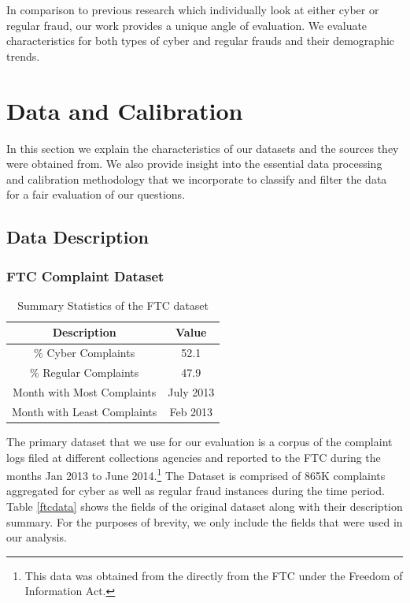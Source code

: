 \documentclass[conference]{IEEEtran}
\begin{document}
In comparison to previous research which individually look at either cyber or regular fraud, our work provides a unique angle of evaluation. We evaluate characteristics for both types of cyber and regular frauds and their demographic trends.

\section{Data and Calibration} \label{data-cal}

In this section we explain the characteristics of our datasets and the sources they were obtained from. We also provide insight into the essential data processing and calibration methodology that we incorporate to classify and filter the data for a fair evaluation of our questions.

\subsection{Data Description}

\subsubsection{FTC Complaint Dataset}

\begin{table}[h]
\centering
\begin{tabular}{c|c}
\hline
{\bfseries Description} & \multicolumn{1}{c}{\bfseries Value}
\\
\hline
\hline
\% Cyber Complaints &52.1\\
\hline
\% Regular Complaints & 47.9\\
\hline
Month with Most Complaints & July 2013\\
\hline
Month with Least Complaints & Feb 2013\\
\hline
\end{tabular}
\vspace{8pt}
\caption{Summary Statistics of the FTC dataset}\label{ttest}
\vspace{-10pt}
\end{table}


The primary dataset that we use for our evaluation is a corpus of the complaint logs filed at different collections agencies and reported to the FTC during the months Jan 2013 to June 2014.\footnote{This data was obtained from the directly from the FTC under the Freedom of Information Act.} The Dataset is comprised of 865K complaints aggregated for cyber as well as regular fraud instances during the time period. Table \ref{ftcdata} shows the fields of the original dataset along with their description summary. For the purposes of brevity, we only include the fields that were used in our analysis.
\\
\end{document}
